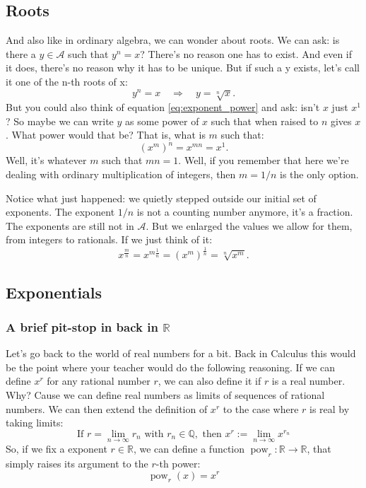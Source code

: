 \subsection{Roots}
And also like in ordinary algebra, we can wonder about roots. We can ask: is there a $y \in \mathcal{A}$ such that $y^n = x$? There's no reason one has to exist. And even if it does, there's no reason why it has to be unique. But if such a y exists, let's call it one of the n-th roots of x:
\begin{equation}
    y^n = x \quad \Rightarrow \quad y = \sqrt[n]{x}.
\end{equation}
But you could also think of equation \eqref{eq:exponent_power} and ask: isn't $x$ just $x^1$? So maybe we can write $y$ as some power of $x$ such that when raised to $n$ gives $x$. What power would that be? That is, what is $m$ such that:
\begin{equation}
    (x^m)^n = x^{mn} = x^1.
\end{equation}
Well, it's whatever $m$ such that $mn = 1$. Well, if you remember that here we're dealing with ordinary multiplication of integers, then $m = 1/n$ is the only option.

Notice what just happened: we quietly stepped outside our initial set of exponents. The exponent $1/n$ is not a counting number anymore, it's a fraction. The exponents are still not in $\mathcal{A}$. But we enlarged the values we allow for them, from integers to rationals. If we just think of it:
\begin{equation}
    x^{\frac{m}{n}} = x^{m \frac{1}{n}} = (x^m)^{\frac{1}{n}} = \sqrt[n]{x^m}.
\end{equation}

\subsection{Exponentials}

\subsubsection{A brief pit-stop in back  in $\mathbb{R}$}

Let's go back to the world of real numbers for a bit. Back in Calculus this would be the point where your teacher would do the following reasoning. If we can define $x^r$ for any rational number $r$, we can also define it if $r$ is a real number. Why? Cause we can define real numbers as limits of sequences of rational numbers. We can then extend the definition of $x^r$ to the case where $r$ is real by taking limits:
\begin{equation}
   \text{If } r = \lim_{n \to \infty} r_n \text{ with } r_n \in \mathbb{Q}, \text{ then } x^r := \lim_{n \to \infty} x^{r_n}
\end{equation}
So, if we fix a exponent $r \in \mathbb{R}$, we can define a function $\operatorname{pow}_r: \mathbb{R} \to \mathbb{R}$, that simply raises its argument to the $r$-th power:
\begin{equation}
  \operatorname{pow}_r(x)  =  x^r
\end{equation}

